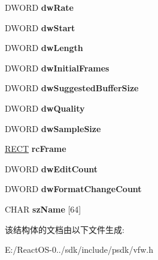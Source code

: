 \begin{DoxyCompactItemize}
D\+W\+O\+RD {\bfseries dw\+Rate}
\item 
\mbox{\label{struct___a_v_i_s_t_r_e_a_m_i_n_f_o_a_a9871deff1225c66904a9723a5ef57e2d}} 
D\+W\+O\+RD {\bfseries dw\+Start}
\item 
\mbox{\label{struct___a_v_i_s_t_r_e_a_m_i_n_f_o_a_ac8fd8ecc24a1a77ff9d59832adf5013b}} 
D\+W\+O\+RD {\bfseries dw\+Length}
\item 
\mbox{\label{struct___a_v_i_s_t_r_e_a_m_i_n_f_o_a_abe37e7cb2d8840d5e0ef35e312e7e365}} 
D\+W\+O\+RD {\bfseries dw\+Initial\+Frames}
\item 
\mbox{\label{struct___a_v_i_s_t_r_e_a_m_i_n_f_o_a_ad73d3347c1047e77c082a0eb54d63e89}} 
D\+W\+O\+RD {\bfseries dw\+Suggested\+Buffer\+Size}
\item 
\mbox{\label{struct___a_v_i_s_t_r_e_a_m_i_n_f_o_a_aa361ba3e168aa4eb6fc2afa36cdeda11}} 
D\+W\+O\+RD {\bfseries dw\+Quality}
\item 
\mbox{\label{struct___a_v_i_s_t_r_e_a_m_i_n_f_o_a_a3f883032d15d9ed17cae93f100eb0891}} 
D\+W\+O\+RD {\bfseries dw\+Sample\+Size}
\item 
\mbox{\label{struct___a_v_i_s_t_r_e_a_m_i_n_f_o_a_a82e4d4d84c44edec63452540b465f0e5}} 
\hyperlink{structtag_r_e_c_t}{R\+E\+CT} {\bfseries rc\+Frame}
\item 
\mbox{\label{struct___a_v_i_s_t_r_e_a_m_i_n_f_o_a_a67a3e3d41857259b3e5b6d88d44b248a}} 
D\+W\+O\+RD {\bfseries dw\+Edit\+Count}
\item 
\mbox{\label{struct___a_v_i_s_t_r_e_a_m_i_n_f_o_a_a9055ef545b19b15d69d80028b81519aa}} 
D\+W\+O\+RD {\bfseries dw\+Format\+Change\+Count}
\item 
\mbox{\label{struct___a_v_i_s_t_r_e_a_m_i_n_f_o_a_ab0a791f9b16cb89d4edee64674c7b033}} 
C\+H\+AR {\bfseries sz\+Name} \mbox{[}64\mbox{]}
\end{DoxyCompactItemize}


该结构体的文档由以下文件生成\+:\begin{DoxyCompactItemize}
\item 
E\+:/\+React\+O\+S-\/0../sdk/include/psdk/vfw.\+h\end{DoxyCompactItemize}
